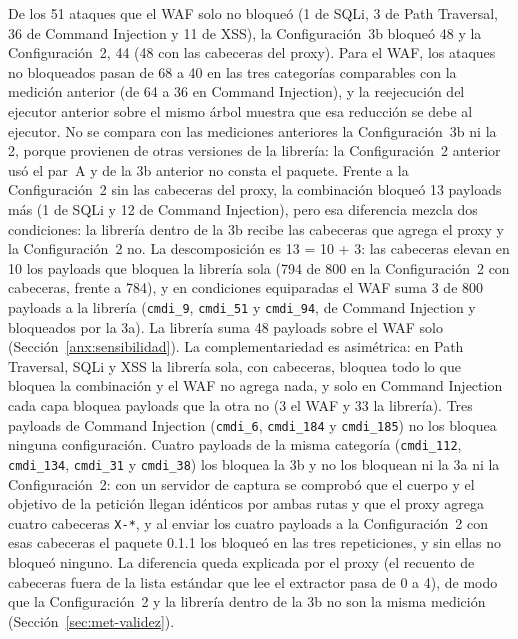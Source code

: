 De los 51 ataques que el WAF solo no bloqueó (1 de SQLi, 3 de Path Traversal, 36 de Command
Injection y 11 de XSS), la Configuración~3b bloqueó 48 y la Configuración~2, 44 (48 con las cabeceras del proxy). Para el WAF, los
ataques no bloqueados pasan de 68 a 40 en las tres categorías comparables con la medición anterior
(de 64 a 36 en Command Injection), y la reejecución del ejecutor anterior sobre el mismo árbol
muestra que esa reducción se debe al ejecutor. No se compara con las mediciones anteriores la
Configuración~3b ni la 2, porque provienen de otras versiones de la librería: la Configuración~2
anterior usó el par~A y de la 3b anterior no consta el paquete. Frente a la Configuración~2 sin las cabeceras del proxy, la combinación bloqueó 13 payloads
más (1 de SQLi y 12 de Command Injection), pero esa diferencia mezcla dos condiciones: la librería
dentro de la 3b recibe las cabeceras que agrega el proxy y la Configuración~2 no. La descomposición
es 13 = 10 + 3: las cabeceras elevan en 10 los payloads que bloquea la librería sola (794 de 800
en la Configuración~2 con cabeceras, frente a 784), y en condiciones equiparadas el WAF suma 3 de
800 payloads a la librería (\texttt{cmdi\_9}, \texttt{cmdi\_51} y \texttt{cmdi\_94}, de Command
Injection y bloqueados por la 3a). La librería suma 48 payloads sobre el WAF solo
(Sección~\ref{anx:sensibilidad}). La complementariedad es asimétrica: en Path Traversal, SQLi y XSS
la librería sola, con cabeceras, bloquea todo lo que bloquea la combinación y el WAF no agrega
nada, y solo en Command Injection cada capa bloquea payloads que la otra no (3 el WAF y 33 la
librería). Tres
payloads de Command Injection (\texttt{cmdi\_6}, \texttt{cmdi\_184} y \texttt{cmdi\_185}) no los
bloquea ninguna configuración. Cuatro payloads de la misma categoría (\texttt{cmdi\_112},
\texttt{cmdi\_134}, \texttt{cmdi\_31} y \texttt{cmdi\_38}) los bloquea la 3b y no los bloquean ni la
3a ni la Configuración~2: con un servidor de captura se comprobó que el cuerpo y el objetivo de la
petición llegan idénticos por ambas rutas y que el proxy agrega cuatro cabeceras \texttt{X-*}, y al
enviar los cuatro payloads a la Configuración~2 con esas cabeceras el paquete 0.1.1 los bloqueó en
las tres repeticiones, y sin ellas no bloqueó ninguno. La diferencia queda explicada por el proxy
(el recuento de cabeceras fuera de la lista estándar que lee el extractor pasa de 0 a 4), de modo
que la Configuración~2 y la librería dentro de la 3b no son la misma medición
(Sección~\ref{sec:met-validez}).

